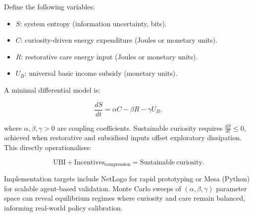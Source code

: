 \documentclass[12pt,a4paper]{article}
\begin{document}
Define the following variables:

\begin{itemize}
\item $S$: system entropy (information uncertainty, bits).
\item $C$: curiosity-driven energy expenditure (Joules or monetary units).
\item $R$: restorative care energy input (Joules or monetary units).
\item $U_B$: universal basic income subsidy (monetary units).
\end{itemize}

A minimal differential model is:

\[
\frac{dS}{dt} = \alpha C - \beta R - \gamma U_B,
\]

where \(\alpha, \beta, \gamma > 0\) are coupling coefficients. 
Sustainable curiosity requires \(\frac{dS}{dt} \leq 0\), 
achieved when restorative and subsidised inputs offset exploratory dissipation. 
This directly operationalises:

\[
\mathrm{UBI} + \mathrm{Incentives}_{\mathrm{compression}} = \mathrm{Sustainable\ curiosity}.
\]

Implementation targets include NetLogo for rapid prototyping 
or Mesa (Python) for scalable agent-based validation. 
Monte Carlo sweeps of $(\alpha,\beta,\gamma)$ parameter space 
can reveal equilibrium regimes where curiosity and care remain balanced, 
informing real-world policy calibration.

\
\

\
\end{document}
